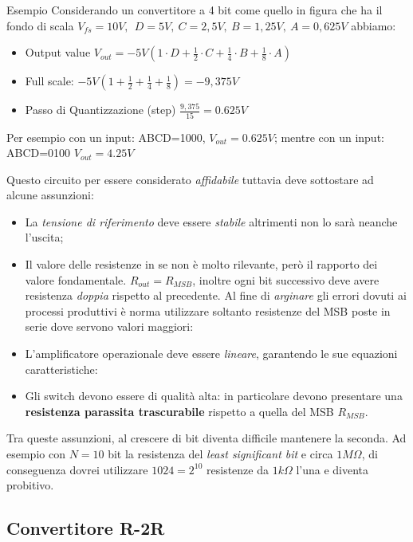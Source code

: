 \documentclass[
]{book}
\providecommand{\tightlist}{%
  \setlength{\itemsep}{0pt}\setlength{\parskip}{0pt}}
\begin{document}
\begin{greenbox}{Esempio}
Considerando un convertitore a 4 bit come quello in figura che ha il fondo di scala $V_{fs}=10V,\:\:D=5V,\:C=2,5V,\:B=1,25V,\:A=0,625V$ abbiamo:
\begin{itemize}
\item Output value $V_{out} = -5V(1 \cdot D + \frac{1}{2}\cdot C + \frac{1}{4}\cdot B + \frac{1}{8}\cdot A)$
\item Full scale: $-5V (1 + \frac{1}{2} + \frac{1}{4} + \frac{1}{8}) = -9,375V$
\item Passo di Quantizzazione (step) $\frac{9,375}{15} = 0.625V$
\end{itemize}
Per esempio con un input: ABCD=1000, $V_{out}= 0.625V$; mentre con un input: ABCD=0100 $V_{out} = 4.25V$
\end{greenbox}

Questo circuito per essere considerato \emph{affidabile} tuttavia deve
sottostare ad alcune assunzioni:

\begin{itemize}
\tightlist
\item
  La \emph{tensione di riferimento} deve essere \emph{stabile}
  altrimenti non lo sarà neanche l'uscita;
\item
  Il valore delle resistenze in se non è molto rilevante, però il
  rapporto dei valore fondamentale. \(R_{out}=R_{MSB}\), inoltre ogni
  bit successivo deve avere resistenza \emph{doppia} rispetto al
  precedente. Al fine di \emph{arginare} gli errori dovuti ai processi
  produttivi è norma utilizzare soltanto resistenze del MSB poste in
  serie dove servono valori maggiori:
\item
  L'amplificatore operazionale deve essere \emph{lineare}, garantendo le
  sue equazioni caratteristiche:
\item
  Gli switch devono essere di qualità alta: in particolare devono
  presentare una \textbf{resistenza parassita trascurabile} rispetto a
  quella del MSB \(R_{MSB}\).
\end{itemize}

Tra queste assunzioni, al crescere di bit diventa difficile mantenere la
seconda. Ad esempio con \(N=10\) bit la resistenza del \emph{least
significant bit} e circa \(1M\Omega\), di conseguenza dovrei utilizzare
\(1024=2^{10}\) resistenze da \(1k\Omega\) l'una e diventa probitivo.

\subsection{Convertitore R-2R}\label{convertitore-r-2r}
\end{document}
